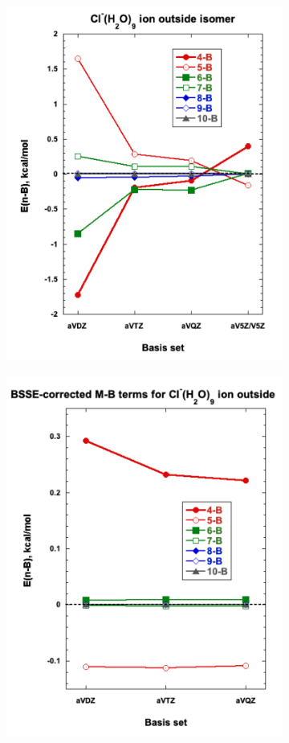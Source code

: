 \documentclass[11pt, proquest]{uwthesis}[2020/02/24]
\begin{document}
\begin{figure}
  \begin{subfigure}[t]{.5\textwidth}
    \centering
    \includegraphics[width=.9\linewidth]{Figures/Chapter_3/figure_7_tl.pdf}
  \end{subfigure}
  \hfill
  \begin{subfigure}[t]{.5\textwidth}
    \centering
    \includegraphics[width=.9\linewidth]{Figures/Chapter_3/figure_7_tr.pdf}
  \end{subfigure}


\end{figure}
\end{document}
